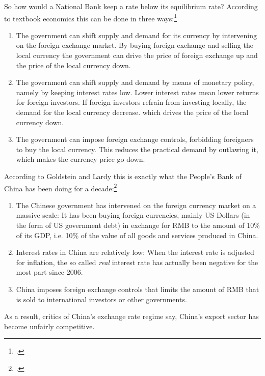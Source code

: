So how would a National Bank keep a rate below its equilibrium rate? According to 
textbook economics this can be done in three ways:\footnote{\cite[pp. 
514]{Krugman2008}.}

\begin{enumerate}
\item{The government can shift supply and demand for its currency by 
	intervening on the foreign exchange market. By buying foreign 
exchange and selling the local currency the government can drive the 
price of foreign exchange up and the price of the local currency down.}
\item{The government can shift supply and demand by means of monetary 
	policy, namely by keeping interest rates low. Lower interest rates 
mean lower returns for foreign investors. If foreign investors refrain 
from investing locally, the demand for the local currency decrease. 
which drives the price of the local currency down.}
\item{The government can impose foreign exchange controls, forbidding 
	foreigners to buy the local currency. This reduces the practical 
demand by outlawing it, which makes the currency price go down.}
\end{enumerate}

According to Goldstein and Lardy this is exactly what the People's Bank 
of China has been doing for a decade:\footnote{\cite[pp. 
40]{Goldstein2008}.}

\begin{enumerate}
\item{The Chinese government has intervened on the foreign currency 
		market on a massive scale: It has been buying foreign 
		currencies, mainly US Dollars (in the form of US government 
		debt) in exchange for RMB to the amount of 10\% of its GDP, i.e. 
		10\% of the value of all goods and services produced in China.} 
	\item{Interest rates in China are relatively low: When the interest 
		rate is adjusted for inflation, the so called \emph{real} 
	interest rate has actually been negative for the most part since 
2006.}
\item{China imposes foreign exchange controls that limits the amount of 
	RMB that is sold to international investors or other governments.}
\end{enumerate}

As a result, critics of China's exchange rate regime say, China's export 
sector has become unfairly competitive. 

